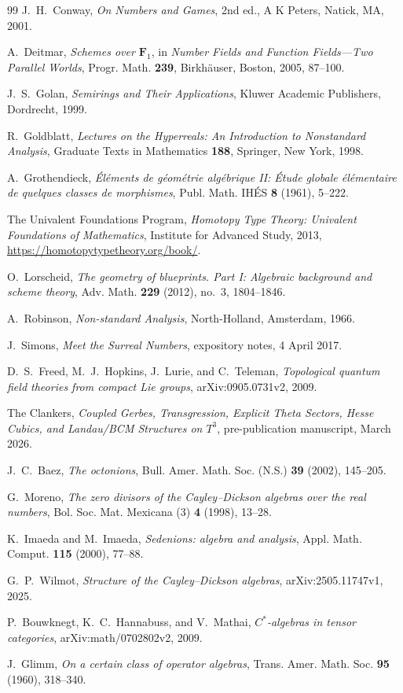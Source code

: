 \documentclass[11pt]{amsart}
\numberwithin{equation}{section}
\theoremstyle{definition}
\newcommand{\Fone}{\mathbf F_1}
\begin{document}
\begin{thebibliography}{99}
J.~H.~Conway,
\emph{On Numbers and Games},
2nd ed., A K Peters, Natick, MA, 2001.

A.~Deitmar,
\emph{Schemes over $\Fone$},
in \emph{Number Fields and Function Fields---Two Parallel Worlds},
Progr. Math. \textbf{239}, Birkh\"auser, Boston, 2005, 87--100.

J.~S.~Golan,
\emph{Semirings and Their Applications},
Kluwer Academic Publishers, Dordrecht, 1999.

R.~Goldblatt,
\emph{Lectures on the Hyperreals: An Introduction to Nonstandard Analysis},
Graduate Texts in Mathematics \textbf{188}, Springer, New York, 1998.

A.~Grothendieck,
\emph{\'El\'ements de g\'eom\'etrie alg\'ebrique II: \'Etude globale
\'el\'ementaire de quelques classes de morphismes},
Publ. Math. IH\'ES \textbf{8} (1961), 5--222.

The Univalent Foundations Program,
\emph{Homotopy Type Theory: Univalent Foundations of Mathematics},
Institute for Advanced Study, 2013,
\url{https://homotopytypetheory.org/book/}.

O.~Lorscheid,
\emph{The geometry of blueprints. Part I: Algebraic background and scheme
theory},
Adv. Math. \textbf{229} (2012), no.~3, 1804--1846.

A.~Robinson,
\emph{Non-standard Analysis},
North-Holland, Amsterdam, 1966.

J.~Simons,
\emph{Meet the Surreal Numbers},
expository notes, 4 April 2017.


D.~S.~Freed, M.~J.~Hopkins, J.~Lurie, and C.~Teleman,
\emph{Topological quantum field theories from compact Lie groups},
arXiv:0905.0731v2, 2009.

The Clankers,
\emph{Coupled Gerbes, Transgression, Explicit Theta Sectors, Hesse Cubics,
and Landau/BCM Structures on $T^3$},
pre-publication manuscript, March 2026.

J.~C.~Baez,
\emph{The octonions},
Bull. Amer. Math. Soc. (N.S.) \textbf{39} (2002), 145--205.

G.~Moreno,
\emph{The zero divisors of the Cayley--Dickson algebras over the real
numbers},
Bol. Soc. Mat. Mexicana (3) \textbf{4} (1998), 13--28.

K.~Imaeda and M.~Imaeda,
\emph{Sedenions: algebra and analysis},
Appl. Math. Comput. \textbf{115} (2000), 77--88.

G.~P.~Wilmot,
\emph{Structure of the Cayley--Dickson algebras},
arXiv:2505.11747v1, 2025.

P.~Bouwknegt, K.~C.~Hannabuss, and V.~Mathai,
\emph{$C^*$-algebras in tensor categories},
arXiv:math/0702802v2, 2009.

J.~Glimm,
\emph{On a certain class of operator algebras},
Trans. Amer. Math. Soc. \textbf{95} (1960), 318--340.

\end{thebibliography}
\end{document}
